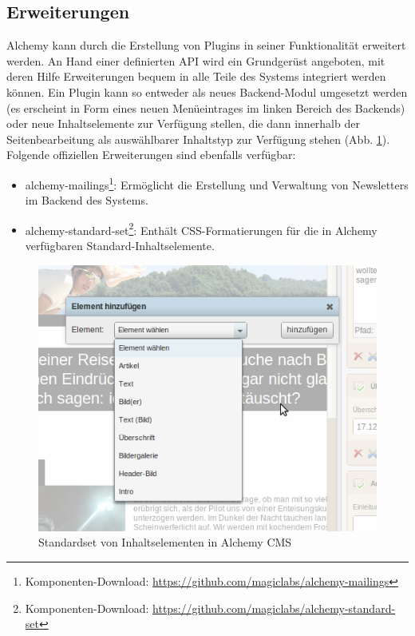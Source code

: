 \subsection{Erweiterungen}
Alchemy kann durch die Erstellung von Plugins in seiner Funktionalität erweitert werden. An Hand einer definierten API wird ein Grundgerüst angeboten, mit deren Hilfe Erweiterungen bequem in alle Teile des Systems integriert werden können. Ein Plugin kann so entweder als neues Backend-Modul umgesetzt werden (es erscheint in Form eines neuen Menüeintrages im linken Bereich des Backends) oder neue Inhaltselemente zur Verfügung stellen, die dann innerhalb der Seitenbearbeitung als auswählbarer Inhaltstyp zur Verfügung stehen (Abb. \ref{img.alchemycontenttypes}).
\newline
\newline
Folgende offiziellen Erweiterungen sind ebenfalls verfügbar:
\begin{itemize}
\item
alchemy-mailings\footnote{Komponenten-Download: \href{https://github.com/magiclabs/alchemy-mailings}{https://github.com/magiclabs/alchemy-mailings}}: Ermöglicht die Erstellung und Verwaltung von Newsletters im Backend des Systems.
\item
alchemy-standard-set\footnote{Komponenten-Download: \href{ https://github.com/magiclabs/alchemy-standard-set}{ https://github.com/magiclabs/alchemy-standard-set}}: Enthält CSS-Formatierungen für die in Alchemy verfügbaren Standard-Inhaltselemente.
\end{itemize}

\begin{figure}[!h]
\begin{center}
\includegraphics[scale=0.6]{images/analyse/alchemy/dialoginhaltselement.png}
\caption{Standardset von Inhaltselementen in Alchemy CMS}
\label{img.alchemycontenttypes}
\end{center}
\end{figure}



